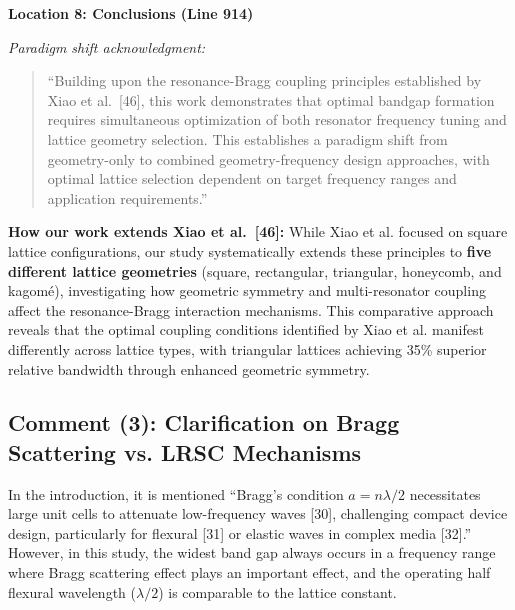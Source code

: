 \documentclass[11pt,a4paper]{article}
\newenvironment{reviewerbox}{%
    \par\medskip\noindent{\color{reviewercolor}\rule{\linewidth}{2pt}}\par
    \noindent{\color{reviewercolor}\bfseries Reviewer Comment}\par\smallskip
}{%
    \par\noindent{\color{reviewercolor}\rule{\linewidth}{0.5pt}}\medskip
}
\newenvironment{changesbox}{%
    \par\medskip\noindent{\color{changescolor}\rule{\linewidth}{2pt}}\par
    \noindent{\color{changescolor}\bfseries Manuscript Changes}\par\smallskip
}{%
    \par\noindent{\color{changescolor}\rule{\linewidth}{0.5pt}}\medskip
}
\begin{document}
\begin{changesbox}
\textbf{Location 8: Conclusions (Line 914)}

\textit{Paradigm shift acknowledgment:}
\begin{quote}
\textcolor{redtext}{``Building upon the resonance-Bragg coupling principles established by Xiao et al.~[46], this work demonstrates that optimal bandgap formation requires simultaneous optimization of both resonator frequency tuning and lattice geometry selection. This establishes a paradigm shift from geometry-only to combined geometry-frequency design approaches, with optimal lattice selection dependent on target frequency ranges and application requirements.''}
\end{quote}
\end{changesbox}

\textbf{How our work extends Xiao et al.~[46]:} While Xiao et al. focused on square lattice configurations, our study systematically extends these principles to \textbf{five different lattice geometries} (square, rectangular, triangular, honeycomb, and kagom\'{e}), investigating how geometric symmetry and multi-resonator coupling affect the resonance-Bragg interaction mechanisms. This comparative approach reveals that the optimal coupling conditions identified by Xiao et al. manifest differently across lattice types, with triangular lattices achieving 35\% superior relative bandwidth through enhanced geometric symmetry.

\newpage

\subsection*{Comment (3): Clarification on Bragg Scattering vs. LRSC Mechanisms}

\begin{reviewerbox}
In the introduction, it is mentioned ``Bragg's condition $a = n\lambda/2$ necessitates large unit cells to attenuate low-frequency waves [30], challenging compact device design, particularly for flexural [31] or elastic waves in complex media [32].'' However, in this study, the widest band gap always occurs in a frequency range where Bragg scattering effect plays an important effect, and the operating half flexural wavelength ($\lambda/2$) is comparable to the lattice constant.
\end{reviewerbox}
\end{document}
